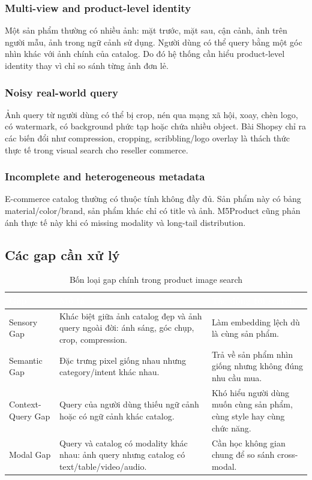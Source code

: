 \documentclass[12pt,a4paper]{article}
\begin{document}
\subsubsection{Multi-view and product-level identity}
Một sản phẩm thường có nhiều ảnh: mặt trước, mặt sau, cận cảnh, ảnh trên người mẫu, ảnh trong ngữ cảnh sử dụng. Người dùng có thể query bằng một góc nhìn khác với ảnh chính của catalog. Do đó hệ thống cần hiểu product-level identity thay vì chỉ so sánh từng ảnh đơn lẻ.

\subsubsection{Noisy real-world query}
Ảnh query từ người dùng có thể bị crop, nén qua mạng xã hội, xoay, chèn logo, có watermark, có background phức tạp hoặc chứa nhiều object. Bài Shopsy chỉ ra các biến đổi như compression, cropping, scribbling/logo overlay là thách thức thực tế trong visual search cho reseller commerce.

\subsubsection{Incomplete and heterogeneous metadata}
E-commerce catalog thường có thuộc tính không đầy đủ. Sản phẩm này có bảng material/color/brand, sản phẩm khác chỉ có title và ảnh. M5Product cũng phản ánh thực tế này khi có missing modality và long-tail distribution.

\subsection{Các gap cần xử lý}
\begin{table}[htbp]
\centering
\begin{tabularx}{\linewidth}{@{}L{2.6cm}Y Y@{}}
\toprule
{}
\textcolor{white}{\textbf{Gap}} & \textcolor{white}{\textbf{Mô tả}} & \textcolor{white}{\textbf{Tác động tới search}} \\
\midrule
Sensory Gap & Khác biệt giữa ảnh catalog đẹp và ảnh query ngoài đời: ánh sáng, góc chụp, crop, compression. & Làm embedding lệch dù là cùng sản phẩm. \\
Semantic Gap & Đặc trưng pixel giống nhau nhưng category/intent khác nhau. & Trả về sản phẩm nhìn giống nhưng không đúng nhu cầu mua. \\
Context-Query Gap & Query của người dùng thiếu ngữ cảnh hoặc có ngữ cảnh khác catalog. & Khó hiểu người dùng muốn cùng sản phẩm, cùng style hay cùng chức năng. \\
Modal Gap & Query và catalog có modality khác nhau: ảnh query nhưng catalog có text/table/video/audio. & Cần học không gian chung để so sánh cross-modal. \\
\bottomrule
\end{tabularx}
\caption{Bốn loại gap chính trong product image search}
\end{table}
\end{document}
